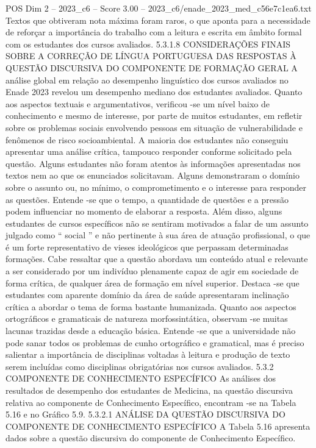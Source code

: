 \begin{textsample}{POS Dim 2 – 2023\_c6 – Score 3.00 – 2023\_c6/enade\_2023\_med\_c56e7c1ea6.txt}
Textos que obtiveram nota máxima foram raros, o que aponta para a necessidade de reforçar a importância do trabalho com a leitura e escrita em âmbito formal com os estudantes dos cursos avaliados. 5.3.1.8 CONSIDERAÇÕES FINAIS SOBRE A CORREÇÃO DE LÍNGUA PORTUGUESA DAS RESPOSTAS À QUESTÃO DISCURSIVA DO COMPONENTE DE FORMAÇÃO GERAL A análise global em relação ao desempenho linguístico dos cursos avaliados no Enade 2023 revelou um desempenho mediano dos estudantes avaliados.
Quanto aos aspectos textuais e argumentativos, verificou -se um nível baixo de conhecimento e mesmo de interesse, por parte de muitos estudantes, em refletir sobre os problemas sociais envolvendo pessoas em situação de vulnerabilidade e fenômenos de risco socioambiental.
A maioria dos estudantes não conseguiu apresentar uma análise crítica, tampouco responder conforme solicitado pela questão.
Alguns estudantes não foram atentos às informações apresentadas nos textos nem ao que os enunciados solicitavam.
Alguns demonstraram o domínio sobre o assunto ou, no mínimo, o comprometimento e o interesse para responder as questões.
Entende -se que o tempo, a quantidade de questões e a pressão podem influenciar no momento de elaborar a resposta.
Além disso, alguns estudantes de cursos específicos não se sentiram motivados a falar de um assunto julgado como “ social ” e não pertinente à sua área de atuação profissional, o que é um forte representativo de vieses ideológicos que perpassam determinadas formações.
Cabe ressaltar que a questão abordava um conteúdo atual e relevante a ser considerado por um indivíduo plenamente capaz de agir em sociedade de forma crítica, de qualquer área de formação em nível superior.
Destaca -se que estudantes com aparente domínio da área de saúde apresentaram inclinação crítica a abordar o tema de forma bastante humanizada.
Quanto aos aspectos ortográficos e gramaticais de natureza morfossintática, observam -se muitas lacunas trazidas desde a educação básica.
Entende -se que a universidade não pode sanar todos os problemas de cunho ortográfico e gramatical, mas é preciso salientar a importância de disciplinas voltadas à leitura e produção de texto serem incluídas como disciplinas obrigatórias nos cursos avaliados. 5.3.2 COMPONENTE DE CONHECIMENTO ESPECÍFICO As análises dos resultados de desempenho dos estudantes de Medicina, na questão discursiva relativa ao componente de Conhecimento Específico, encontram -se na Tabela 5.16 e no Gráfico 5.9. 5.3.2.1 ANÁLISE DA QUESTÃO DISCURSIVA DO COMPONENTE DE CONHECIMENTO ESPECÍFICO A Tabela 5.16 apresenta dados sobre a questão discursiva do componente de Conhecimento Específico.

\end{textsample}
